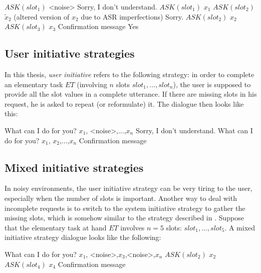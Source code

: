 		\begin{dialogue}
			 $ASK(slot_1)$
                         <noise>
			 Sorry, I don't understand. $ASK(slot_1)$
			 $x_1$
			 $ASK(slot_2)$
                         $\tilde{x}_2$ (altered version of $x_2$ due to ASR imperfections)
                         Sorry. $ASK(slot_2)$
                         $x_2$
			 $ASK(slot_3)$
			 $x_3$
			 Confirmation message
                         Yes
		\end{dialogue}
	
	\subsection{User initiative strategies}
	
		In this thesis, \textit{user initiative} refers to the following strategy: in order to complete an elementary task $ET$ (involving $n$ slots $slot_1,...,slot_n$), the user is supposed to provide all the slot values in a complete utterance. If there are missing slots in his request, he is asked to repeat (or reformulate) it. The dialogue then looks like this:
		
		\begin{dialogue}
			 What can I do for you?
			 $x_1$, <noise>,...,$x_n$
			 Sorry, I don't understand. What can I do for you?
			 $x_1$, $x_2$,...,$x_n$
			 Confirmation message
		\end{dialogue}
	
	\subsection{Mixed initiative strategies}
	
		In noisy environments, the user initiative strategy can be very tiring to the user, especially when the number of slots is important. Another way to deal with incomplete requests is to switch to the system initiative strategy to gather the missing slots, which is somehow similar to the strategy described in \cite{Lamel2000}. Suppose that the elementary task at hand $ET$ involves $n=5$ slots: $slot_1,...,slot_5$. A mixed initiative strategy dialogue looks like the following:
		
		\begin{dialogue}
			 What can I do for you?
			 $x_1$, <noise>,$x_3$,<noise>,$x_n$
			 $ASK(slot_2)$
			\speak{USER} $x_2$
			 $ASK(slot_4)$
			\speak{USER} $x_4$
			 Confirmation message
		\end{dialogue}

